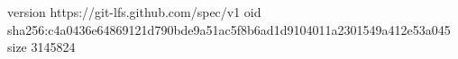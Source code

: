 version https://git-lfs.github.com/spec/v1
oid sha256:c4a0436e64869121d790bde9a51ac5f8b6ad1d9104011a2301549a412e53a045
size 3145824
